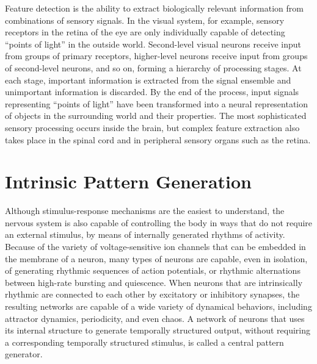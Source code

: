 Feature detection is the ability to extract biologically relevant information from combinations of sensory signals. In the visual system, for example, sensory receptors in the retina of the eye are only individually capable of detecting ``points of light'' in the outside world. Second-level visual neurons receive input from groups of primary receptors, higher-level neurons receive input from groups of second-level neurons, and so on, forming a hierarchy of processing stages. At each stage, important information is extracted from the signal ensemble and unimportant information is discarded. By the end of the process, input signals representing ``points of light'' have been transformed into a neural representation of objects in the surrounding world and their properties. The most sophisticated sensory processing occurs inside the brain, but complex feature extraction also takes place in the spinal cord and in peripheral sensory organs such as the retina.

\hypertarget{intrinsic-pattern-generation}{%
\section{Intrinsic Pattern Generation}\label{intrinsic-pattern-generation}}

Although stimulus-response mechanisms are the easiest to understand, the nervous system is also capable of controlling the body in ways that do not require an external stimulus, by means of internally generated rhythms of activity. Because of the variety of voltage-sensitive ion channels that can be embedded in the membrane of a neuron, many types of neurons are capable, even in isolation, of generating rhythmic sequences of action potentials, or rhythmic alternations between high-rate bursting and quiescence. When neurons that are intrinsically rhythmic are connected to each other by excitatory or inhibitory synapses, the resulting networks are capable of a wide variety of dynamical behaviors, including attractor dynamics, periodicity, and even chaos. A network of neurons that uses its internal structure to generate temporally structured output, without requiring a corresponding temporally structured stimulus, is called a central pattern generator.

